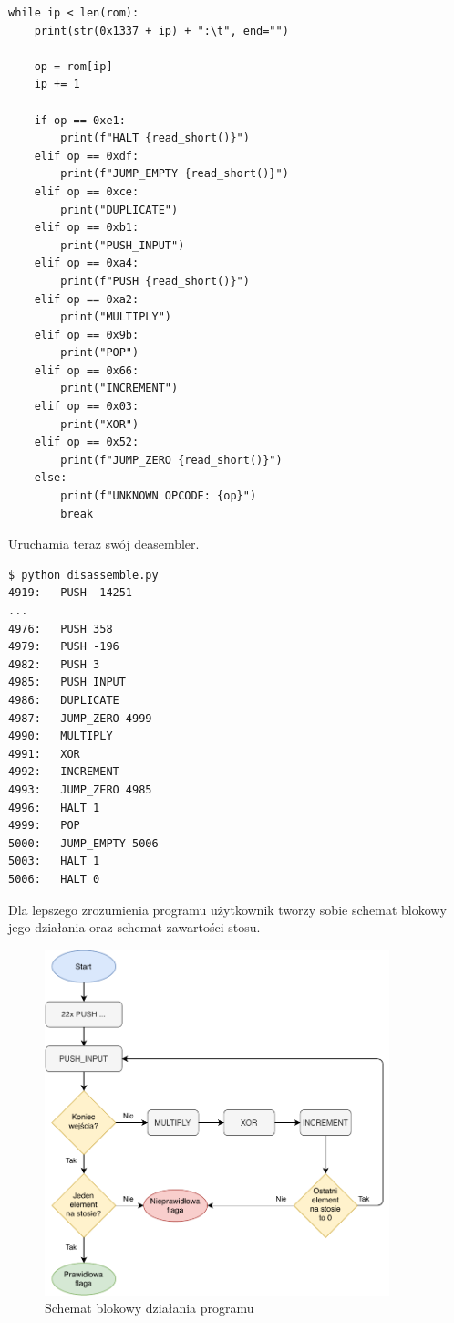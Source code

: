 \documentclass[language=polish,type=eng]{aghmodern}
\begin{document}
\begin{verbatim}
while ip < len(rom):
    print(str(0x1337 + ip) + ":\t", end="")

    op = rom[ip]
    ip += 1

    if op == 0xe1:
        print(f"HALT {read_short()}")
    elif op == 0xdf:
        print(f"JUMP_EMPTY {read_short()}")
    elif op == 0xce:
        print("DUPLICATE")
    elif op == 0xb1:
        print("PUSH_INPUT")
    elif op == 0xa4:
        print(f"PUSH {read_short()}")
    elif op == 0xa2:
        print("MULTIPLY")
    elif op == 0x9b:
        print("POP")
    elif op == 0x66:
        print("INCREMENT")
    elif op == 0x03:
        print("XOR")
    elif op == 0x52:
        print(f"JUMP_ZERO {read_short()}")
    else:
        print(f"UNKNOWN OPCODE: {op}")
        break
\end{verbatim}

Uruchamia teraz swój deasembler.

\begin{verbatim}
$ python disassemble.py 
4919:   PUSH -14251
...
4976:   PUSH 358
4979:   PUSH -196
4982:   PUSH 3
4985:   PUSH_INPUT
4986:   DUPLICATE
4987:   JUMP_ZERO 4999
4990:   MULTIPLY
4991:   XOR
4992:   INCREMENT
4993:   JUMP_ZERO 4985
4996:   HALT 1
4999:   POP
5000:   JUMP_EMPTY 5006
5003:   HALT 1
5006:   HALT 0
\end{verbatim}

Dla lepszego zrozumienia programu użytkownik tworzy sobie schemat blokowy jego działania
oraz schemat zawartości stosu.

\begin{figure}[H]
\centering
\includegraphics[width=10cm]{600_flowchart}
\caption{Schemat blokowy działania programu}
\label{fig:600_flowchart}
\end{figure}
\end{document}
